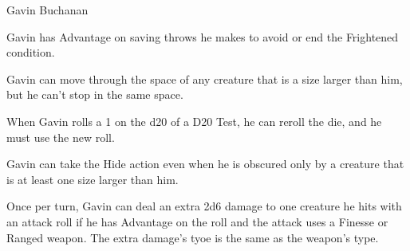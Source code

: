 \begin{DndMonster}[width=0.5\textwidth]{Gavin Buchanan}
	
	\DndMonsterBasics[
		armor-class = {15 (Leather Armor)},
		hit-points  = {\DndDice{2d10 + 4}},
		speed       = {30 ft.},
	]
	
	\renewcommand{\AbilityScoreSpacer}{~}
	\DndMonsterAbilityScores[
		str = 9,
		dex = 18,
		con = 14,
		int = 15,
		wis = 13,
		cha = 12,
	]
	
	\DndMonsterDetails[
		saving-throws = {DEX +6, INT +4},
		skills = {Acrobatics +6, Perception +5, Stealth +8},
		senses = {Passive Perception 15},
		languages = {Common, Thieves' Cant},
		challenge = 1/2,
	]
    
	Gavin has Advantage on saving throws he makes to avoid or end the Frightened condition.
	
	Gavin can move through the space of any creature that is a size larger than him, but he can't stop in the same space.
	
	When Gavin rolls a 1 on the d20 of a D20 Test, he can reroll the die, and he must use the new roll.
	
	Gavin can take the Hide action even when he is obscured only by a creature that is at least one size larger than him.
	
	Once per turn, Gavin can deal an extra 2d6 damage to one creature he hits with an attack roll if he has Advantage on the roll and the attack uses a Finesse or Ranged weapon. The extra damage's tyoe is the same as the weapon's type.
	
	\DndMonsterAttack[
		name=Dagger,
		distance=melee, %
		mod=+6,
		reach=5,
		targets=one target,
		dmg=\DndDice{1d4 + 4},
		dmg-type=piercing,
	]
	
	\DndMonsterAttack[
		name=Shortbow,
		distance=ranged, %
		mod=+6,
		range=80/320,
		targets=one target,
		dmg=\DndDice{1d6 + 4},
		dmg-type=piercing,
	]
	

\end{DndMonster}
